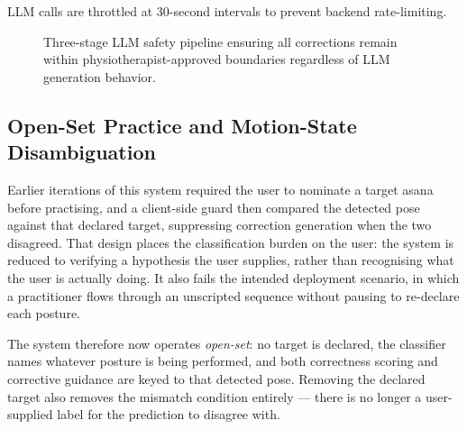 \documentclass[conference]{IEEEtran}
\begin{document}
\noindent LLM calls are throttled at 30-second intervals to prevent backend rate-limiting.

\begin{figure}[ht]
\centering
{}
\caption{Three-stage LLM safety pipeline ensuring all corrections remain within
physiotherapist-approved boundaries regardless of LLM generation behavior.}
\label{fig:safety}
\end{figure}

\subsection{Open-Set Practice and Motion-State Disambiguation}
\label{sec:mismatch}

Earlier iterations of this system required the user to nominate a target asana
before practising, and a client-side guard then compared the detected pose
against that declared target, suppressing correction generation when the two
disagreed. That design places the classification burden on the user: the
system is reduced to verifying a hypothesis the user supplies, rather than
recognising what the user is actually doing. It also fails the intended
deployment scenario, in which a practitioner flows through an unscripted
sequence without pausing to re-declare each posture.

The system therefore now operates \emph{open-set}: no target is declared, the
classifier names whatever posture is being performed, and both correctness
scoring and corrective guidance are keyed to that detected pose. Removing the
declared target also removes the mismatch condition entirely --- there is no
longer a user-supplied label for the prediction to disagree with.
\end{document}
